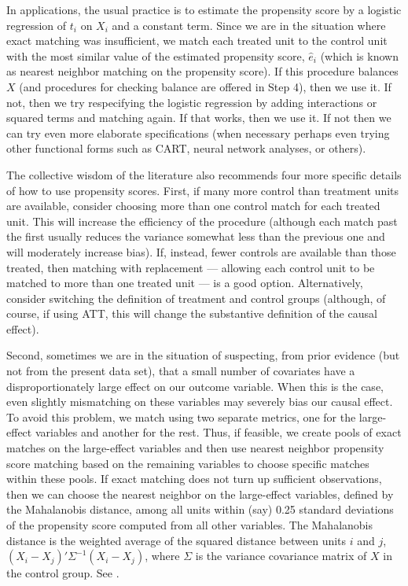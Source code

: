 \documentclass[11pt,titlepage]{article}
\begin{document}
In applications, the usual practice is to estimate the propensity
score by a logistic regression of $t_i$ on $X_i$ and a constant term.
Since we are in the situation where exact matching was insufficient,
we match each treated unit to the control unit with the most similar
value of the estimated propensity score, $\hat{e}_i$ (which is known as nearest
neighbor matching on the propensity score).  If this procedure
balances $X$ (and procedures for checking balance are offered in
Step 4), then we use it.  If not, then we try respecifying the
logistic regression by adding interactions or squared terms and
matching again.  If that works, then we use it.  If not then we can
try even more elaborate specifications (when necessary perhaps even
trying other functional forms such as CART, neural network analyses,
or others).

The collective wisdom of the literature also recommends four more
specific details of how to use propensity scores.  First, if many more
control than treatment units are available, consider choosing more
than one control match for each treated unit.  This will increase the
efficiency of the procedure (although each match past the first
usually reduces the variance somewhat less than the previous one and will
moderately increase bias).
If, instead, fewer controls are available than those treated, then
matching with replacement --- allowing each control unit to be matched
to more than one treated unit --- is a good option.  Alternatively,
consider switching the definition of treatment and control groups
(although, of course, if using ATT, this will change the substantive
definition of the causal effect).

Second, sometimes we are in the situation of suspecting, from prior
evidence (but not from the present data set), that a small number of
covariates have a disproportionately large effect on our outcome
variable.  When this is the case, even slightly mismatching on these
variables may severely bias our causal effect.  To avoid this problem,
we match using two separate metrics, one for the large-effect variables
and another for the rest.  Thus, if feasible, we create pools of
exact matches on the large-effect variables and then use nearest
neighbor propensity score matching based on the remaining variables to
choose specific matches within these pools.  If exact matching does
not turn up sufficient observations, then we can choose the nearest
neighbor on the large-effect variables, defined by the Mahalanobis distance, among all units within
(say) 0.25 standard deviations of the propensity score computed from
all other variables.  The Mahalanobis distance is the weighted average
of the squared distance between units $i$ and $j$,
$(X_i-X_j)'\Sigma^{-1}(X_i-X_j)$, where $\Sigma$ is the variance
covariance matrix of $X$ in the control group.  See \cite{RubTho00}.
\end{document}

